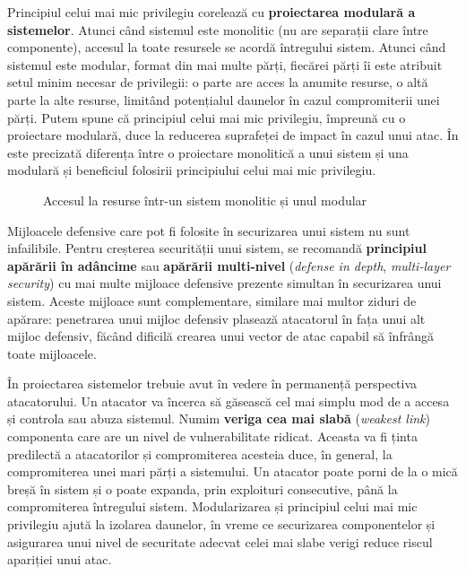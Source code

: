 Principiul celui mai mic privilegiu corelează cu \textbf{proiectarea modulară a sistemelor}.
Atunci când sistemul este monolitic (nu are separații clare între componente), accesul la toate resursele se acordă întregului sistem.
Atunci când sistemul este modular, format din mai multe părți, fiecărei părți îi este atribuit setul minim necesar de privilegii: o parte are acces la anumite resurse, o altă parte la alte resurse, limitând potențialul daunelor în cazul compromiterii unei părți.
Putem spune că principiul celui mai mic privilegiu, împreună cu o proiectare modulară, duce la reducerea suprafeței de impact în cazul unui atac.
În  este precizată diferența între o proiectare monolitică a unui sistem și una modulară și beneficiul folosirii principiului celui mai mic privilegiu.

\begin{figure}[htbp]
  \centering
  \def\svgwidth{\columnwidth}
  
  \caption{Accesul la resurse într-un sistem monolitic și unul modular}
  \label{fig:sec:modular-vs-monolithic}
\end{figure}

Mijloacele defensive care pot fi folosite în securizarea unui sistem nu sunt infailibile.
Pentru creșterea securității unui sistem, se recomandă \textbf{principiul apărării în adâncime} sau \textbf{apărării multi-nivel} (\textit{defense in depth}, \textit{multi-layer security}) cu mai multe mijloace defensive prezente simultan în securizarea unui sistem.
Aceste mijloace sunt complementare, similare mai multor ziduri de apărare: penetrarea unui mijloc defensiv plasează atacatorul în fața unui alt mijloc defensiv, făcând dificilă crearea unui vector de atac capabil să înfrângă toate mijloacele.

În proiectarea sistemelor trebuie avut în vedere în permanență perspectiva atacatorului.
Un atacator va încerca să găsească cel mai simplu mod de a accesa și controla sau abuza sistemul.
Numim \textbf{veriga cea mai slabă} (\textit{weakest link}) componenta care are un nivel de vulnerabilitate ridicat.
Aceasta va fi ținta predilectă a atacatorilor și compromiterea acesteia duce, în general, la compromiterea unei mari părți a sistemului.
Un atacator poate porni de la o mică breșă în sistem și o poate expanda, prin exploituri consecutive, până la compromiterea întregului sistem.
Modularizarea și principiul celui mai mic privilegiu ajută la izolarea daunelor, în vreme ce securizarea componentelor și asigurarea unui nivel de securitate adecvat celei mai slabe verigi reduce riscul apariției unui atac.

